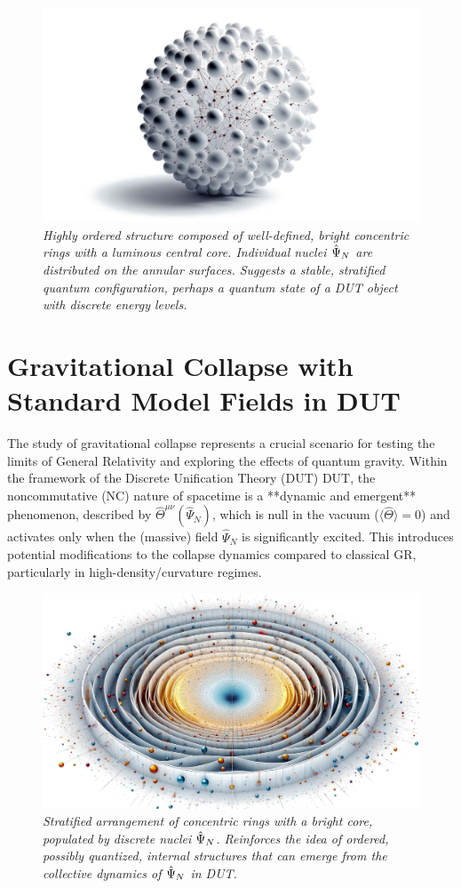 \documentclass[11pt, a4paper]{article}
\theoremstyle{remark}
\newcommand{\Op}[1]{\hat{#1}}
\begin{document}
\begin{figure}[htbp]
    \centering
    \includegraphics[width=0.6\linewidth]{OIG12.ZNLJ.PNG} %
    \caption{%
      \footnotesize\textit{Highly ordered structure composed of well-defined, bright concentric rings with a luminous central core. Individual nuclei \(\protect\Op{\Psi}_N\) are distributed on the annular surfaces. Suggests a stable, stratified quantum configuration, perhaps a quantum state of a DUT object with discrete energy levels.}
    }
    \label{fig:Figura14}
\end{figure}

\section{Gravitational Collapse with Standard Model Fields in DUT }
\label{sec:collapse_TUD_ME}

The study of gravitational collapse represents a crucial scenario for testing the limits of General Relativity and exploring the effects of quantum gravity. Within the framework of the Discrete Unification Theory (DUT) DUT, the noncommutative (NC) nature of spacetime is a **dynamic and emergent** phenomenon, described by \( \Op{\Theta}^{\mu\nu}(\Op{\Psi}_N) \), which is null in the vacuum (\( \langle \Op{\Theta} \rangle = 0 \)) and activates only when the (massive) field \( \Op{\Psi}_N \) is significantly excited. This introduces potential modifications to the collapse dynamics compared to classical GR, particularly in high-density/curvature regimes.

\begin{figure}[htbp]
    \centering
    \includegraphics[width=0.6\linewidth]{OIG26.ZNLJ.PNG}
    \caption{%
      \footnotesize\textit{Stratified arrangement of concentric rings with a bright core, populated by discrete nuclei \(\protect\Op{\Psi}_N\). Reinforces the idea of ordered, possibly quantized, internal structures that can emerge from the collective dynamics of \(\protect\Op{\Psi}_N\) in DUT.}
    }
    \label{fig:Figura16}
\end{figure}
\end{document}
